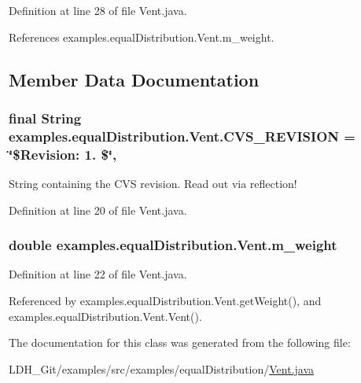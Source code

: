 Definition at line 28 of file Vent.\-java.



References examples.\-equal\-Distribution.\-Vent.\-m\-\_\-weight.



\subsection{Member Data Documentation}
\hypertarget{classexamples_1_1equal_distribution_1_1_vent_aff4d9324fa452954070a30252bde531f}{
\subsubsection[{C\-V\-S\-\_\-\-R\-E\-V\-I\-S\-I\-O\-N}]{\setlength{\rightskip}{0pt plus 5cm}final String examples.\-equal\-Distribution.\-Vent.\-C\-V\-S\-\_\-\-R\-E\-V\-I\-S\-I\-O\-N = \char`\"{}\$Revision\-: 1. \$\char`\"{}\hspace{0.3cm}{\ttfamily [static]}, {\ttfamily [private]}}}\label{classexamples_1_1equal_distribution_1_1_vent_aff4d9324fa452954070a30252bde531f}
String containing the C\-V\-S revision. Read out via reflection! 

Definition at line 20 of file Vent.\-java.

\hypertarget{classexamples_1_1equal_distribution_1_1_vent_ad81bfcb29d6aaec499b8ebca76ae245e}{
\subsubsection[{m\-\_\-weight}]{\setlength{\rightskip}{0pt plus 5cm}double examples.\-equal\-Distribution.\-Vent.\-m\-\_\-weight\hspace{0.3cm}{\ttfamily [private]}}}\label{classexamples_1_1equal_distribution_1_1_vent_ad81bfcb29d6aaec499b8ebca76ae245e}


Definition at line 22 of file Vent.\-java.



Referenced by examples.\-equal\-Distribution.\-Vent.\-get\-Weight(), and examples.\-equal\-Distribution.\-Vent.\-Vent().



The documentation for this class was generated from the following file\-:\begin{DoxyCompactItemize}
\item 
L\-D\-H\-\_\-\-Git/examples/src/examples/equal\-Distribution/\hyperlink{_vent_8java}{Vent.\-java}\end{DoxyCompactItemize}
